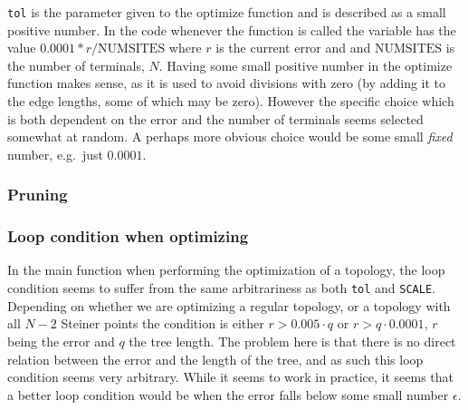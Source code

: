 \texttt{tol} is the parameter given to the optimize function and is described as
a small positive number.  In the code whenever the function is called the
variable has the value $0.0001*r/\text{NUMSITES}$ where $r$ is the current
error and and $\text{NUMSITES}$ is the number of terminals, $N$.  Having some
small positive number in the optimize function makes sense, as it is used to
avoid divisions with zero (by adding it to the edge lengths, some of which may
be zero).  However the specific choice which is both dependent on the error and
the number of terminals seems selected somewhat at random.  A perhaps more
obvious choice would be some small \textit{fixed} number, e.g.\ just $0.0001$.


\subsubsection{Pruning}
\label{sec:pruning}


\subsubsection{Loop condition when optimizing}
\label{sec:loop-condition-when-1}

In the main function when performing the optimization of a topology, the loop
condition seems to suffer from the same arbitrariness as both \texttt{tol} and
\texttt{SCALE}.  Depending on whether we are optimizing a regular topology, or a
topology with all $N-2$ Steiner points the condition is either $r > 0.005 \cdot
q$ or $r > q \cdot 0.0001$, $r$ being the error and $q$ the tree length.  The
problem here is that there is no direct relation between the error and the
length of the tree, and as such this loop condition seems very arbitrary.  While
it seems to work in practice, it seems that a better loop condition would be
when the error falls below some small number $\epsilon$.


